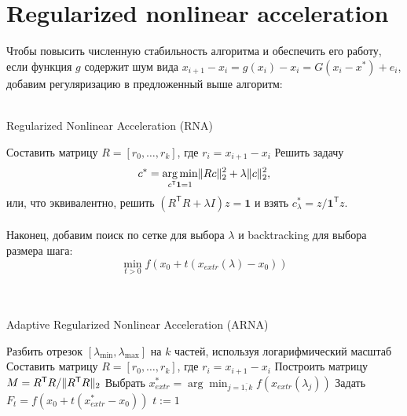 \documentclass[12pt]{article}
\theoremstyle{definition}
\numberwithin{Def}{section}
\numberwithin{Th}{section}
\numberwithin{Prop}{section}
\numberwithin{St}{section}
\numberwithin{Cor}{section}
\begin{document}
\section{Regularized nonlinear acceleration}

Чтобы повысить численную стабильность алгоритма и обеспечить его работу, если
функция $g$ содержит шум вида $x_{i+1}-x_i=g(x_i)-x_i=G(x_i-x^*)+e_i$,
добавим регуляризацию в предложенный выше алгоритм:
\\\\
\begin{algorithm*}[H]
\caption{Regularized Nonlinear Acceleration (RNA)}
\LinesNumbered
 Составить матрицу $R=[r_0,\ldots,r_k]$, где $r_i=x_{i+1}-x_i$\;
 Решить задачу
 $$
 c^*=\underset{c^\mathsf{T}\mathbf{1}=1}{\arg\min}\|Rc\|_2^2+\lambda\|c\|_2^2,
 $$
 или, что эквивалентно, решить $(R^\mathsf{T}R+\lambda I)z=\mathbf{1}$ и взять
 $c^*_\lambda=z/\mathbf{1}^\mathsf{T}z$.
 
\end{algorithm*}

\paragraph{}Наконец, добавим поиск по сетке для выбора $\lambda$ и backtracking
для выбора размера шага:
$$
\min_{t>0}f(x_0+t(x_{extr}(\lambda)-x_0))
$$
\\\\
\begin{algorithm*}[H]
\caption{Adaptive Regularized Nonlinear Acceleration (ARNA)}
\LinesNumbered
 Разбить отрезок $[\lambda_{\min},\lambda_{\max}]$ на $k$ частей, используя
 логарифмический масштаб\;
 Составить матрицу $R=[r_0,\ldots,r_k]$, где $r_i=x_{i+1}-x_i$\;
 Построить матрицу $M=R^\mathsf{T}R/\|R^\mathsf{T}R\|_2$\;
 Выбрать $x^*_{extr}=\arg\min_{j=\overline{1,k}}
 f(x_{extr}(\lambda_j))$\;
 Задать $F_t=f(x_0+t(x^*_{extr}-x_0))$\;
 $t:=1$\;
\end{algorithm*}
\end{document}
